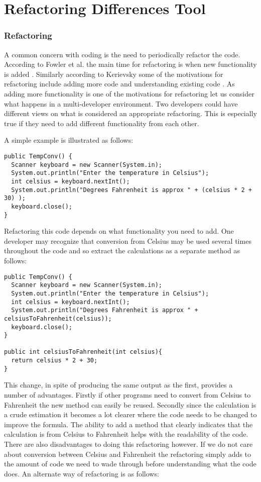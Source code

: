 

\chapter{Refactoring Differences Tool}


\subsection{Refactoring}
A common concern with coding is the need to periodically refactor the code. According to Fowler et al. the main time for refactoring is when new functionality is added \cite{Fowler1999}. Similarly according to Kerievsky some of the motivations for refactoring include adding more code and understanding existing code \cite{Kerievsky2004}. As adding more functionality is one of the motivations for refactoring let us consider what happens in a multi-developer environment. Two developers could have different views on what is considered an appropriate refactoring. This is especially true if they need to add different functionality from each other. 

A simple example is illustrated as follows:
\begin{verbatim}
public TempConv() {
  Scanner keyboard = new Scanner(System.in);
  System.out.println("Enter the temperature in Celsius");
  int celsius = keyboard.nextInt();
  System.out.println("Degrees Fahrenheit is approx " + (celsius * 2 + 30) );
  keyboard.close();
}
\end{verbatim}

Refactoring this code depends on what functionality you need to add. One developer may recognize that conversion from Celsius may be used several times throughout the code and so extract the calculations as a separate method as follows:

\begin{verbatim}
public TempConv() {
  Scanner keyboard = new Scanner(System.in);
  System.out.println("Enter the temperature in Celsius");
  int celsius = keyboard.nextInt();
  System.out.println("Degrees Fahrenheit is approx " + celsiusToFahrenheit(celsius));
  keyboard.close();
}

public int celsiusToFahrenheit(int celsius){
  return celsius * 2 + 30;
}
\end{verbatim}

This change, in spite of producing the same output as the first, provides a number of advantages. Firstly if other programs need to convert from Celsius to Fahrenheit the new method can easily be reused. Secondly since the calculation is a crude estimation it becomes a lot clearer where the code needs to be changed to improve the formula. The ability to add a method that clearly indicates that the calculation is from Celsius to Fahrenheit helps with the readability of the code. There are also disadvantages to doing this refactoring however. If we do not care about conversion between Celsius and Fahrenheit the refactoring simply adds to the amount of code we need to wade through before understanding what the code does. An alternate way of refactoring is as follows:

